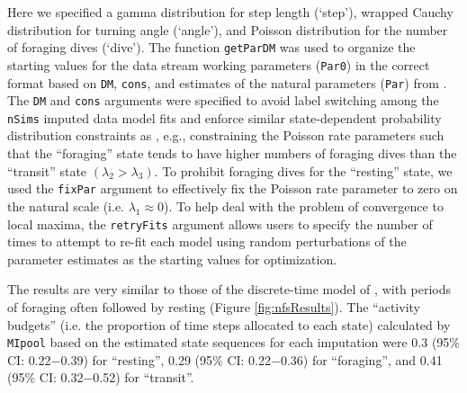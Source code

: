 \documentclass[12pt]{article}
\begin{document}
Here we specified a gamma distribution for step length (`step'), wrapped Cauchy distribution for turning angle (`angle'), and Poisson distribution for the number of foraging dives (`dive'). The function \verb|getParDM| was used to organize the starting values for the data stream working parameters (\verb|Par0|) in the correct format based on \verb|DM|, \verb|cons|, and estimates of the natural parameters (\verb|Par|) from \cite{McClintockEtAl2014b}. The \verb|DM| and \verb|cons| arguments were specified to avoid label switching among the \verb|nSims| imputed data model fits and enforce similar state-dependent probability distribution constraints as \cite{McClintockEtAl2014b}, e.g., constraining the Poisson rate parameters such that the ``foraging'' state tends to have higher numbers of foraging dives than the ``transit'' state $(\lambda_2 > \lambda_3)$. To prohibit foraging dives for the ``resting'' state, we used the \verb|fixPar| argument to effectively fix the Poisson rate parameter to zero on the natural scale (i.e. $\lambda_1 \approx 0$).  To help deal with the problem of convergence to local maxima, the \verb|retryFits| argument allows users to specify the number of times to attempt to re-fit each model using random perturbations of the parameter estimates as the starting values for optimization.

The results are very similar to those of the discrete-time model of \cite{McClintockEtAl2014b}, with periods of foraging often followed by resting (Figure \ref{fig:nfsResults}).  The ``activity budgets'' (i.e. the proportion of time steps allocated to each state) calculated by \verb|MIpool| based on the estimated state sequences for each imputation were 0.3 (95\% CI: 0.22$-$0.39) for ``resting'', 0.29 (95\% CI: 0.22$-$0.36) for ``foraging'', and 0.41 (95\% CI: 0.32$-$0.52) for ``transit''.
\end{document}
